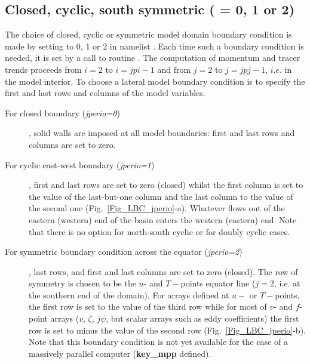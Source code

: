 \documentclass[NEMO_book]{subfiles}
\begin{document}
\subsection{Closed, cyclic, south symmetric ( = 0, 1 or 2)}
\label{LBC_jperio012}

The choice of closed, cyclic or symmetric model domain boundary condition is made 
by setting  to 0, 1 or 2 in namelist . Each time such a boundary 
condition is needed, it is set by a call to routine . The computation of 
momentum and tracer trends proceeds from $i=2$ to $i=jpi-1$ and from $j=2$ to 
$j=jpj-1$, $i.e.$ in the model interior. To choose a lateral model boundary condition 
is to specify the first and last rows and columns of the model variables. 

\begin{description}

\item[For closed boundary (\textit{jperio=0})], solid walls are imposed at all model 
boundaries: first and last rows and columns are set to zero.

\item[For cyclic east-west boundary (\textit{jperio=1})], first and last rows are set 
to zero (closed) whilst the first column is set to the value of the last-but-one column 
and the last column to the value of the second one (Fig.~\ref{Fig_LBC_jperio}-a). 
Whatever flows out of the eastern (western) end of the basin enters the western 
(eastern) end. Note that there is no option for north-south cyclic or for doubly 
cyclic cases.

\item[For symmetric boundary condition across the equator (\textit{jperio=2})], 
last rows, and first and last columns are set to zero (closed). The row of symmetry 
is chosen to be the $u$- and $T-$points equator line ($j=2$, i.e. at the southern 
end of the domain). For arrays defined at $u-$ or $T-$points, the first row is set 
to the value of the third row while for most of $v$- and $f$-point arrays ($v$, $\zeta$, 
$j\psi$, but  scalar arrays such as eddy coefficients) 
the first row is set to minus the value of the second row (Fig.~\ref{Fig_LBC_jperio}-b). 
Note that this boundary condition is not yet available for the case of a massively 
parallel computer (\textbf{key{\_}mpp} defined).

\end{description}
\end{document}
